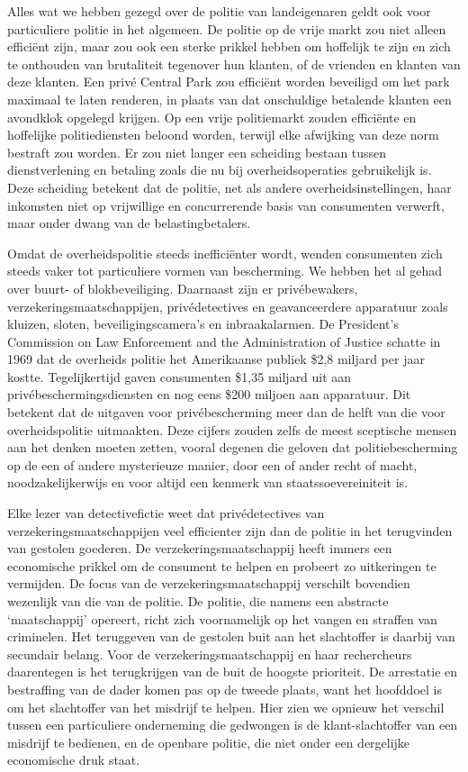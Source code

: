 \documentclass[
  a5paper,
  smalldemyvopaper,10pt,twoside,onecolumn,openright,extrafontsizes,hidelinks]{memoir}
\begin{document}
Alles wat we hebben gezegd over de politie van landeigenaren geldt ook
voor particuliere politie in het algemeen. De politie op de vrije markt
zou niet alleen efficiënt zijn, maar zou ook een sterke prikkel hebben
om hoffelijk te zijn en zich te onthouden van brutaliteit tegenover hun
klanten, of de vrienden en klanten van deze klanten. Een privé Central
Park zou efficiënt worden beveiligd om het park maximaal te laten
renderen, in plaats van dat onschuldige betalende klanten een avondklok
opgelegd krijgen. Op een vrije politiemarkt zouden efficiënte en
hoffelijke politiediensten beloond worden, terwijl elke afwijking van
deze norm bestraft zou worden. Er zou niet langer een scheiding bestaan
tussen dienstverlening en betaling zoals die nu bij overheidsoperaties
gebruikelijk is. Deze scheiding betekent dat de politie, net als andere
overheidsinstellingen, haar inkomsten niet op vrijwillige en
concurrerende basis van consumenten verwerft, maar onder dwang van de
belastingbetalers.

Omdat de overheidspolitie steeds inefficiënter wordt, wenden consumenten
zich steeds vaker tot particuliere vormen van bescherming. We hebben het
al gehad over buurt- of blokbeveiliging. Daarnaast zijn er
privébewakers, verzekeringsmaatschappijen, privédetectives en
geavanceerdere apparatuur zoals kluizen, sloten, beveiligingscamera's en
inbraakalarmen. De President's Commission on Law Enforcement and the
Administration of Justice schatte in 1969 dat de overheids politie het
Amerikaanse publiek \$2,8 miljard per jaar kostte. Tegelijkertijd gaven
consumenten \$1,35 miljard uit aan privébeschermingsdiensten en nog eens
\$200 miljoen aan apparatuur. Dit betekent dat de uitgaven voor
privébescherming meer dan de helft van die voor overheidspolitie
uitmaakten. Deze cijfers zouden zelfs de meest sceptische mensen aan het
denken moeten zetten, vooral degenen die geloven dat politiebescherming
op de een of andere mysterieuze manier, door een of ander recht of
macht, noodzakelijkerwijs en voor altijd een kenmerk van
staatssoevereiniteit is.

Elke lezer van detectivefictie weet dat privédetectives van
verzekeringsmaatschappijen veel efficienter zijn dan de politie in het
terugvinden van gestolen goederen. De verzekeringsmaatschappij heeft
immers een economische prikkel om de consument te helpen en probeert zo
uitkeringen te vermijden. De focus van de verzekeringsmaatschappij
verschilt bovendien wezenlijk van die van de politie. De politie, die
namens een abstracte `maatschappij' opereert, richt zich voornamelijk op
het vangen en straffen van criminelen. Het teruggeven van de gestolen
buit aan het slachtoffer is daarbij van secundair belang. Voor de
verzekeringsmaatschappij en haar rechercheurs daarentegen is het
terugkrijgen van de buit de hoogste prioriteit. De arrestatie en
bestraffing van de dader komen pas op de tweede plaats, want het
hoofddoel is om het slachtoffer van het misdrijf te helpen. Hier zien we
opnieuw het verschil tussen een particuliere onderneming die gedwongen
is de klant-slachtoffer van een misdrijf te bedienen, en de openbare
politie, die niet onder een dergelijke economische druk staat.
\end{document}
